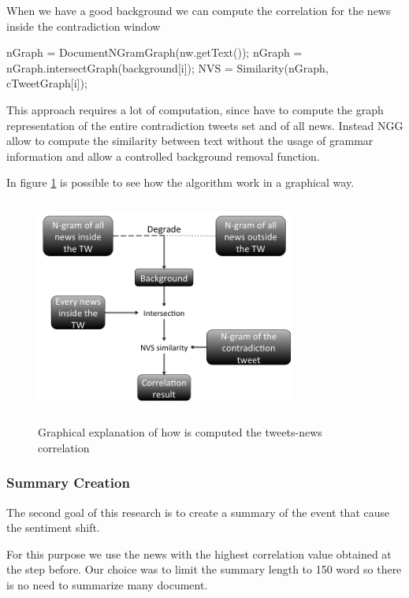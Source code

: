 When we have a good background we can compute the correlation for the news inside the contradiction window
\begin{algorithmic}
		\STATE nGraph = DocumentNGramGraph(nw.getText());
        \STATE nGraph = nGraph.intersectGraph(background[i]);
        \STATE NVS = Similarity(nGraph, cTweetGraph[i]);
	\ENDIF
\ENDFOR        
\end{algorithmic}

This approach requires a lot of computation, since have to compute the graph representation of the entire contradiction tweets set and of all news. Instead NGG allow to compute the similarity between text without the usage of grammar information and allow a controlled background removal function.

In figure \ref{fig:N-gram-expl} is possible to see how the algorithm work in a graphical way.


\begin{figure}[htbp]
	\centering
			{\includegraphics[width=8.5cm,height=7cm]{image/N-gram-expl.png}}	
		\caption[N-gram-expl]{Graphical explanation of how is computed the tweets-news correlation}
	\label{fig:N-gram-expl}
\end{figure} 

\subsubsection*{Summary Creation}
The second goal of this research is to create a summary of the event that cause the sentiment shift. 

For this purpose we use the news with the highest correlation value obtained at the step before.
Our choice was to limit the summary length to 150 word so there is no need to summarize many document. 


